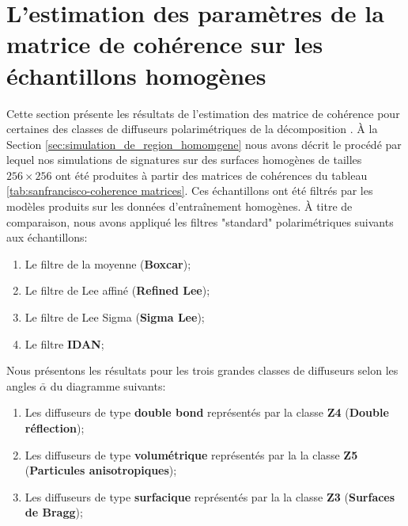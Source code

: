 


\section{L'estimation des paramètres de la matrice de cohérence sur les échantillons homogènes } \label{section:estimation_cohérence_homogene}

Cette section présente les résultats de l'estimation des matrice de cohérence pour certaines des classes de diffuseurs polarimétriques de la décomposition \halpha. À la Section \ref{sec:simulation_de_region_homomgene} nous avons décrit le procédé par lequel nos simulations de signatures sur des surfaces homogènes de tailles $256 \times 256$ ont été produites à partir des matrices de cohérences du tableau \ref{tab:sanfrancisco-coherence matrices}. Ces échantillons ont été filtrés par les modèles produits sur les données d'entraînement homogènes. À titre de comparaison, nous avons appliqué les filtres "standard" polarimétriques suivants aux échantillons:

\begin{enumerate}
    \item Le filtre de la moyenne (\textbf{Boxcar});
    \item Le filtre de Lee affiné (\textbf{Refined Lee});
    \item Le filtre de Lee Sigma (\textbf{Sigma Lee});
    \item Le filtre \textbf{IDAN};
\end{enumerate}

Nous présentons les résultats pour les trois grandes classes de diffuseurs selon les angles $\bar{\alpha}$ du diagramme \halpha suivants:

\begin{enumerate}
    \item Les diffuseurs de type \textbf{double bond} représentés par la classe \textbf{Z4} (\textbf{Double réflection}); 
    \item Les diffuseurs de type \textbf{volumétrique} représentés par la la classe \textbf{Z5} (\textbf{Particules anisotropiques}); 
    \item Les diffuseurs de type \textbf{surfacique} représentés par la la classe \textbf{Z3} (\textbf{Surfaces de Bragg}); 
\end{enumerate}

